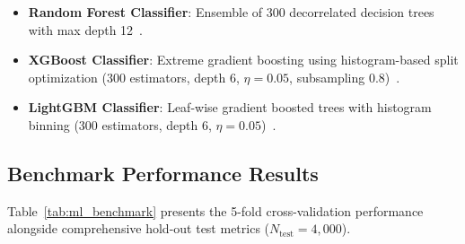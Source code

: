 \documentclass[11pt,a4paper]{article}
\begin{document}
\begin{enumerate}
\begin{itemize}[noitemsep]
        \item \textbf{Random Forest Classifier}: Ensemble of 300 decorrelated decision trees with max depth 12~\cite{breiman2001random}.
        \item \textbf{XGBoost Classifier}: Extreme gradient boosting using histogram-based split optimization (300 estimators, depth 6, $\eta=0.05$, subsampling 0.8)~\cite{chen2016xgboost}.
        \item \textbf{LightGBM Classifier}: Leaf-wise gradient boosted trees with histogram binning (300 estimators, depth 6, $\eta=0.05$)~\cite{ke2017lightgbm}.
    \end{itemize}
\end{enumerate}

\subsection{Benchmark Performance Results}
Table~\ref{tab:ml_benchmark} presents the 5-fold cross-validation performance alongside comprehensive hold-out test metrics ($N_{\text{test}} = 4{,}000$).

\begin{table}[H]
\centering
\small
\caption{Classification benchmark using strictly 16 topological features ($N_{\text{train}} = 16{,}000, N_{\text{test}} = 4{,}000$).}
\label{tab:ml_benchmark}
\end{table}
\end{document}
